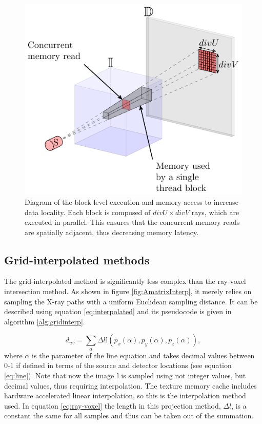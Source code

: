 \begin{figure}
\begin{center}

\includegraphics{GPUmethods/threadblocks-figure0.pdf} 
\end{center}

\caption[Diagram of trheadblock optimized kernel execution]{\label{fig:block} Diagram of the block level execution and memory access to increase data locality. Each block is composed of $divU\times divV$ rays, which are executed in parallel. This ensures that the concurrent memory reads are spatially adjacent, thus decreasing memory latency.} 
\end{figure}




\subsection{Grid-interpolated methods}

The grid-interpolated method is significantly less complex than the ray-voxel intersection method. As shown in figure \ref{fig:AmatrixInterp}, it merely relies on sampling the X-ray paths with a uniform Euclidean sampling distance. It can be described using equation \ref{eq:interpolated} and its pseudocode is given in algorithm \ref{alg:gridinterp}.

\begin{equation}
d_{uv}= \sum_{\alpha}\Delta l\mathbb{I}(p_x(\alpha),p_y(\alpha),p_z(\alpha)),
\label{eq:interpolated}
\end{equation}
where $\alpha$ is the parameter of the line equation and takes decimal values between 0-1 if defined in terms of the source and detector locations (see equation \ref{eq:line}). Note that now the image $\mathbb{I}$ is sampled using not integer values, but decimal values, thus requiring interpolation. The texture memory cache includes hardware accelerated linear interpolation, so this is the interpolation method used. In equation \ref{eq:ray-voxel} the length in this projection method, $\Delta l$, is a constant the same for all samples and thus can be taken out of the summation.

